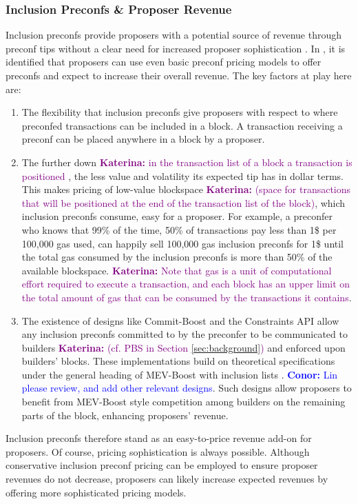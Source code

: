 \documentclass[a4paper]{article}
\theoremstyle{boldstyle}
\newcommand{\cm}[1]{\textcolor{blue}{\textbf{Conor:} #1}}
\newcommand{\ks}[1]{\textcolor{purple}{\textbf{Katerina:} #1}}
\begin{document}
    \subsubsection{Inclusion Preconfs \& Proposer Revenue}
\label{inclusion_revenue}
    Inclusion preconfs provide proposers with a potential source of revenue through preconf tips without a clear need for increased proposer sophistication \cite{W:APricingModelforInclusionPreconfirmations, W:PricingTransactionsforPreconfirmation}. In \cite{W:APricingModelforInclusionPreconfirmations, W:PricingTransactionsforPreconfirmation},  it is identified that proposers can use even basic preconf pricing models to offer preconfs and expect to increase their overall revenue. The key factors at play here are:
    \begin{enumerate}
        \item The flexibility that inclusion preconfs give proposers with respect to where preconfed transactions can be included in a block. A transaction receiving a preconf can be placed anywhere in a block by a proposer.
        \item The further down \ks{in the transaction list of a block a transaction is positioned} %
        , the less value and volatility its expected tip has in dollar terms. This makes pricing of low-value blockspace \ks{(space for transactions that will be positioned at the end of the transaction list of the block)}, which inclusion preconfs consume, easy for a proposer. For example, a preconfer who knows that 99\% of the time, 50\% of transactions pay less than 1\$ per 100,000 gas used, can happily sell 100,000 gas inclusion preconfs for 1\$ until the total gas consumed by the inclusion preconfs is more than 50\% of the available blockspace. \ks{Note that gas is a unit of computational effort required to execute a transaction, and each block has an upper limit on the total amount of gas that can be consumed by the transactions it contains}. 
        \item The existence of designs like Commit-Boost \cite{CommitBoostRepo} and the Constraints API \cite{W:ConstraintsAPISpecification} allow any inclusion preconfs committed to by the preconfer to be communicated to builders \ks{(cf. PBS in Section \ref{sec:background})} and enforced upon builders' blocks. These implementations build on theoretical specifications under the general heading of MEV-Boost with inclusion lists \cite{ResistanceisnotfutileCRinMEVBOOST}. \cm{Lin please review, and add other relevant designs}. Such designs allow proposers to benefit from MEV-Boost style competition among builders on the remaining parts of the block, enhancing proposers' revenue. 
    \end{enumerate}
    Inclusion preconfs therefore stand as an easy-to-price revenue add-on for proposers. Of course, pricing sophistication is always possible. Although conservative inclusion preconf pricing can be employed to ensure proposer revenues do not decrease, proposers can likely increase expected revenues by offering more sophisticated pricing models. 
    
\end{document}
